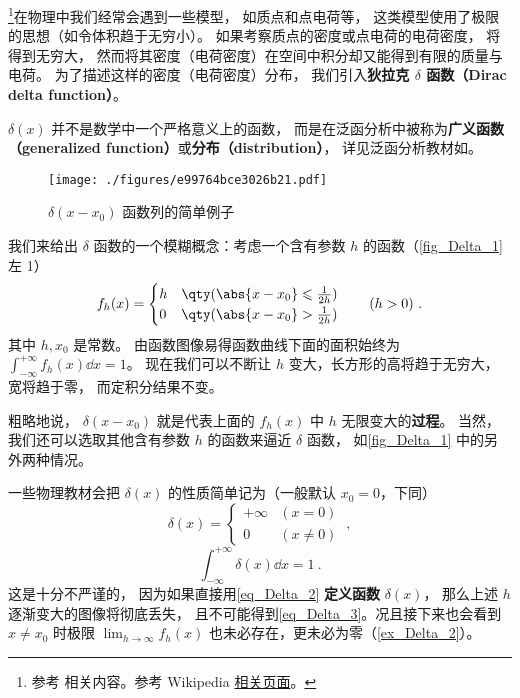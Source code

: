 
\footnote{参考 \cite{Arfken} 相关内容。参考 Wikipedia \href{https://en.wikipedia.org/wiki/Dirac_delta_function}{相关页面}。}在物理中我们经常会遇到一些模型， 如质点和点电荷等， 这类模型使用了极限的思想（如令体积趋于无穷小）。 如果考察质点的密度或点电荷的电荷密度， 将得到无穷大， 然而将其密度（电荷密度）在空间中积分却又能得到有限的质量与电荷。 为了描述这样的密度（电荷密度）分布， 我们引入\textbf{狄拉克 $\delta$ 函数（Dirac delta function）}。

$\delta(x)$ 并不是数学中一个严格意义上的函数， 而是在泛函分析中被称为\textbf{广义函数（generalized function）}或\textbf{分布（distribution）}， 详见泛函分析教材如\cite{Zeidler}。

\begin{figure}[ht]
\centering
\texttt{[image: ./figures/e99764bce3026b21.pdf]}
\caption{$\delta(x - x_0)$ 函数列的简单例子} \label{fig_Delta_1}
\end{figure}

我们来给出 $\delta$ 函数的一个模糊概念：考虑一个含有参数 $h$ 的函数（\autoref{fig_Delta_1} 左 1）
\begin{equation}\label{eq_Delta_6}
f_h(x) =
\begin{cases}
h & \qty( \abs{x - x_0} \leqslant \frac{1}{2h} )\\
0 & \qty( \abs{x - x_0} > \frac{1}{2h} )
\end{cases}\qquad (h > 0)~.
\end{equation}
其中 $h, x_0$ 是常数。 由函数图像易得函数曲线下面的面积始终为 $\int_{-\infty}^{+\infty} f_h(x) \dd{x} = 1$。 现在我们可以不断让 $h$ 变大，长方形的高将趋于无穷大， 宽将趋于零， 而定积分结果不变。

粗略地说， $\delta(x - x_0)$ 就是代表上面的 $f_h(x)$ 中 $h$ 无限变大的\textbf{过程}。 当然， 我们还可以选取其他含有参数 $h$ 的函数来逼近 $\delta$ 函数， 如\autoref{fig_Delta_1} 中的另外两种情况。

一些物理教材会把 $\delta(x)$ 的性质简单记为（一般默认 $x_0 = 0$，下同）
\begin{equation}\label{eq_Delta_2}
\delta(x) =
\begin{cases}
+\infty & (x = 0)\\
0 & (x \ne 0)
\end{cases}~,
\end{equation}
\begin{equation}\label{eq_Delta_3}
\int_{-\infty}^{+\infty} \delta(x) \dd{x} = 1~.
\end{equation}
这是十分不严谨的， 因为如果直接用\autoref{eq_Delta_2} \textbf{定义函数} $\delta(x)$， 那么上述 $h$ 逐渐变大的图像将彻底丢失， 且不可能得到\autoref{eq_Delta_3}。况且接下来也会看到 $x \ne x_0$ 时极限 $\lim_{h\to \infty}f_h(x)$ 也未必存在，更未必为零（\autoref{ex_Delta_2}）。

